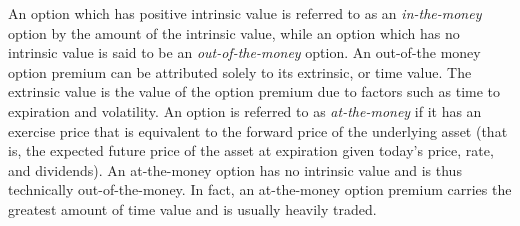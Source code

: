 \documentclass[12pt, a4paper, notitlepage]{article}
\numberwithin{equation}{subsection}
\numberwithin{figure}{subsection}
\numberwithin{table}{subsection}
\newcommand{\newpar}{\newline \newline}
\begin{document}
An option which has positive intrinsic value is referred to as an \textit{in-the-money} option by the amount of the intrinsic value, while an option which has no intrinsic value is said to be an \textit{out-of-the-money} option.  An out-of-the money option premium can be attributed solely to its extrinsic, or time value.  The extrinsic value is the value of the option premium due to factors such as time to expiration and volatility.
\newpar
An option is referred to as \textit{at-the-money} if it has an exercise price that is equivalent to the forward price of the underlying asset (that is, the expected future price of the asset at expiration given today's price, rate, and dividends).  An at-the-money option has no intrinsic value and is thus technically out-of-the-money.  In fact, an at-the-money option premium carries the greatest amount of time value and is usually heavily traded.
\end{document}

